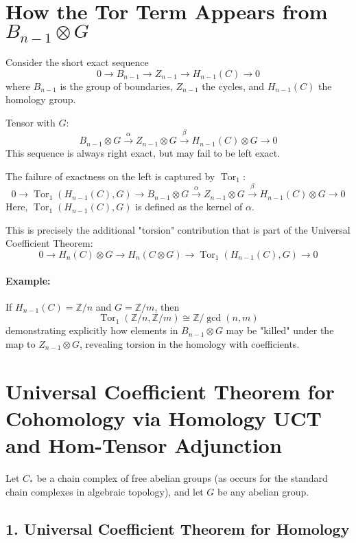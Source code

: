 \documentclass[12pt]{article}
\begin{document}
\section*{How the Tor Term Appears from $B_{n-1}\otimes G$}

Consider the short exact sequence
\[
0 \to B_{n-1} \to Z_{n-1} \to H_{n-1}(C) \to 0
\]
where $B_{n-1}$ is the group of boundaries, $Z_{n-1}$ the cycles, and $H_{n-1}(C)$ the homology group.

Tensor with $G$:
\[
B_{n-1} \otimes G \xrightarrow{\alpha} Z_{n-1} \otimes G \xrightarrow{\beta} H_{n-1}(C) \otimes G \to 0
\]
This sequence is always right exact, but may fail to be left exact.

The failure of exactness on the left is captured by $\operatorname{Tor}_1$:
\[
0 \to \operatorname{Tor}_1(H_{n-1}(C), G) \to B_{n-1} \otimes G \xrightarrow{\alpha} Z_{n-1} \otimes G \xrightarrow{\beta} H_{n-1}(C) \otimes G \to 0
\]
Here, $\operatorname{Tor}_1(H_{n-1}(C), G)$ is defined as the kernel of $\alpha$.

This is precisely the additional "torsion" contribution that is part of the Universal Coefficient Theorem:
\[
0 \longrightarrow H_n(C) \otimes G \longrightarrow H_n(C \otimes G) \longrightarrow \operatorname{Tor}_1(H_{n-1}(C), G) \longrightarrow 0
\]

\paragraph{Example:}
If $H_{n-1}(C) = \mathbb{Z}/n$ and $G = \mathbb{Z}/m$, then
\[
\operatorname{Tor}_1(\mathbb{Z}/n, \mathbb{Z}/m) \cong \mathbb{Z}/\gcd(n, m)
\]
demonstrating explicitly how elements in $B_{n-1} \otimes G$ may be "killed" under the map to $Z_{n-1} \otimes G$, revealing torsion in the homology with coefficients.

\newpage

\section*{Universal Coefficient Theorem for Cohomology via Homology UCT and Hom-Tensor Adjunction}

Let $C_\ast$ be a chain complex of free abelian groups (as occurs for the standard chain complexes in algebraic topology), and let $G$ be any abelian group.

\subsection*{1. Universal Coefficient Theorem for Homology}
\end{document}
